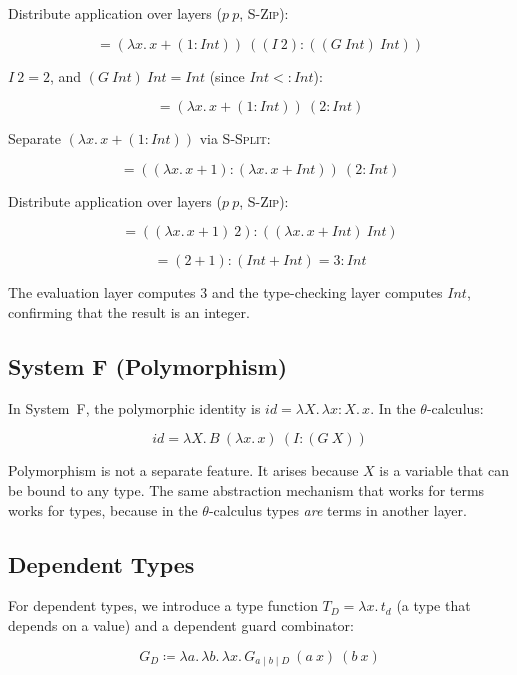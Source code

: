 \documentclass[11pt,letterpaper]{article}
\newif\iffull
\theoremstyle{definition}
\begin{document}
Distribute application over layers ($p\ p$, \textsc{S-Zip}):

$$
= (\lambda x.\,x + (1{:}\mathit{Int}))
  \ ((I\ 2){:}((G\ \mathit{Int})\ \mathit{Int}))
$$

$I\ 2 = 2$, and $(G\ \mathit{Int})\ \mathit{Int} = \mathit{Int}$
(since $\mathit{Int} <: \mathit{Int}$):

$$
= (\lambda x.\,x + (1{:}\mathit{Int}))\ (2{:}\mathit{Int})
$$

Separate $(\lambda x.\,x + (1{:}\mathit{Int}))$ via \textsc{S-Split}:

$$
= ((\lambda x.\,x + 1){:}(\lambda x.\,x + \mathit{Int}))\ (2{:}\mathit{Int})
$$

Distribute application over layers ($p\ p$, \textsc{S-Zip}):

$$
= ((\lambda x.\,x + 1)\ 2){:}((\lambda x.\,x + \mathit{Int})\ \mathit{Int})
$$

$$
= (2 + 1){:}(\mathit{Int} + \mathit{Int}) = 3{:}\mathit{Int}
$$

The evaluation layer computes $3$ and the type-checking layer computes
$\mathit{Int}$, confirming that the result is an integer.

\iffull

\subsection{System F (Polymorphism)}

In System~F, the polymorphic identity is
$\mathit{id} = \lambda X.\, \lambda x{:}X.\, x$.
In the $\theta$-calculus:

$$
\mathit{id} = \lambda X.\, B\ (\lambda x.\, x)\ (I{:}(G\ X))
$$

Polymorphism is not a separate feature. It arises because $X$ is a variable
that can be bound to any type. The same abstraction mechanism that works for
terms works for types, because in the $\theta$-calculus types \emph{are} terms
in another layer.

\subsection{Dependent Types}

For dependent types, we introduce a type function $T_D = \lambda x.\, t_d$
(a type that depends on a value) and a dependent guard combinator:

$$
G_D \coloneqq \lambda a.\,\lambda b.\,\lambda x.\,
  G_{a \mid b \mid D}\ (a\ x)\ (b\ x)
$$
\end{document}
